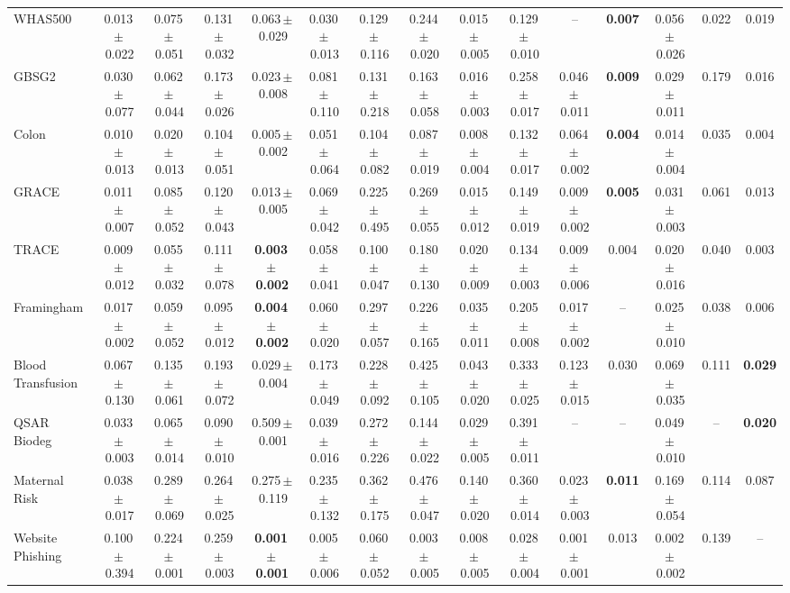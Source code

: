 \documentclass[8pt]{extarticle}
\begin{document}
\begin{longtable}{l*{14}{c}}
WHAS500 & 0.013\,$\pm$\,0.022 & 0.075\,$\pm$\,0.051 & 0.131\,$\pm$\,0.032 & 0.063\,$\pm$\,0.029 & 0.030\,$\pm$\,0.013 & 0.129\,$\pm$\,0.116 & 0.244\,$\pm$\,0.020 & 0.015\,$\pm$\,0.005 & 0.129\,$\pm$\,0.010 & -- & \textbf{0.007} & 0.056\,$\pm$\,0.026 & 0.022 & 0.019 \\
GBSG2 & 0.030\,$\pm$\,0.077 & 0.062\,$\pm$\,0.044 & 0.173\,$\pm$\,0.026 & 0.023\,$\pm$\,0.008 & 0.081\,$\pm$\,0.110 & 0.131\,$\pm$\,0.218 & 0.163\,$\pm$\,0.058 & 0.016\,$\pm$\,0.003 & 0.258\,$\pm$\,0.017 & 0.046\,$\pm$\,0.011 & \textbf{0.009} & 0.029\,$\pm$\,0.011 & 0.179 & 0.016 \\
Colon & 0.010\,$\pm$\,0.013 & 0.020\,$\pm$\,0.013 & 0.104\,$\pm$\,0.051 & 0.005\,$\pm$\,0.002 & 0.051\,$\pm$\,0.064 & 0.104\,$\pm$\,0.082 & 0.087\,$\pm$\,0.019 & 0.008\,$\pm$\,0.004 & 0.132\,$\pm$\,0.017 & 0.064\,$\pm$\,0.002 & \textbf{0.004} & 0.014\,$\pm$\,0.004 & 0.035 & 0.004 \\
GRACE & 0.011\,$\pm$\,0.007 & 0.085\,$\pm$\,0.052 & 0.120\,$\pm$\,0.043 & 0.013\,$\pm$\,0.005 & 0.069\,$\pm$\,0.042 & 0.225\,$\pm$\,0.495 & 0.269\,$\pm$\,0.055 & 0.015\,$\pm$\,0.012 & 0.149\,$\pm$\,0.019 & 0.009\,$\pm$\,0.002 & \textbf{0.005} & 0.031\,$\pm$\,0.003 & 0.061 & 0.013 \\
TRACE & 0.009\,$\pm$\,0.012 & 0.055\,$\pm$\,0.032 & 0.111\,$\pm$\,0.078 & \textbf{0.003\,$\pm$\,0.002} & 0.058\,$\pm$\,0.041 & 0.100\,$\pm$\,0.047 & 0.180\,$\pm$\,0.130 & 0.020\,$\pm$\,0.009 & 0.134\,$\pm$\,0.003 & 0.009\,$\pm$\,0.006 & 0.004 & 0.020\,$\pm$\,0.016 & 0.040 & 0.003 \\
Framingham & 0.017\,$\pm$\,0.002 & 0.059\,$\pm$\,0.052 & 0.095\,$\pm$\,0.012 & \textbf{0.004\,$\pm$\,0.002} & 0.060\,$\pm$\,0.020 & 0.297\,$\pm$\,0.057 & 0.226\,$\pm$\,0.165 & 0.035\,$\pm$\,0.011 & 0.205\,$\pm$\,0.008 & 0.017\,$\pm$\,0.002 & -- & 0.025\,$\pm$\,0.010 & 0.038 & 0.006 \\
Blood Transfusion & 0.067\,$\pm$\,0.130 & 0.135\,$\pm$\,0.061 & 0.193\,$\pm$\,0.072 & 0.029\,$\pm$\,0.004 & 0.173\,$\pm$\,0.049 & 0.228\,$\pm$\,0.092 & 0.425\,$\pm$\,0.105 & 0.043\,$\pm$\,0.020 & 0.333\,$\pm$\,0.025 & 0.123\,$\pm$\,0.015 & 0.030 & 0.069\,$\pm$\,0.035 & 0.111 & \textbf{0.029} \\
QSAR Biodeg & 0.033\,$\pm$\,0.003 & 0.065\,$\pm$\,0.014 & 0.090\,$\pm$\,0.010 & 0.509\,$\pm$\,0.001 & 0.039\,$\pm$\,0.016 & 0.272\,$\pm$\,0.226 & 0.144\,$\pm$\,0.022 & 0.029\,$\pm$\,0.005 & 0.391\,$\pm$\,0.011 & -- & -- & 0.049\,$\pm$\,0.010 & -- & \textbf{0.020} \\
Maternal Risk & 0.038\,$\pm$\,0.017 & 0.289\,$\pm$\,0.069 & 0.264\,$\pm$\,0.025 & 0.275\,$\pm$\,0.119 & 0.235\,$\pm$\,0.132 & 0.362\,$\pm$\,0.175 & 0.476\,$\pm$\,0.047 & 0.140\,$\pm$\,0.020 & 0.360\,$\pm$\,0.014 & 0.023\,$\pm$\,0.003 & \textbf{0.011} & 0.169\,$\pm$\,0.054 & 0.114 & 0.087 \\
Website Phishing & 0.100\,$\pm$\,0.394 & 0.224\,$\pm$\,0.001 & 0.259\,$\pm$\,0.003 & \textbf{0.001\,$\pm$\,0.001} & 0.005\,$\pm$\,0.006 & 0.060\,$\pm$\,0.052 & 0.003\,$\pm$\,0.005 & 0.008\,$\pm$\,0.005 & 0.028\,$\pm$\,0.004 & 0.001\,$\pm$\,0.001 & 0.013 & 0.002\,$\pm$\,0.002 & 0.139 & -- \\
\end{longtable}
\end{document}
